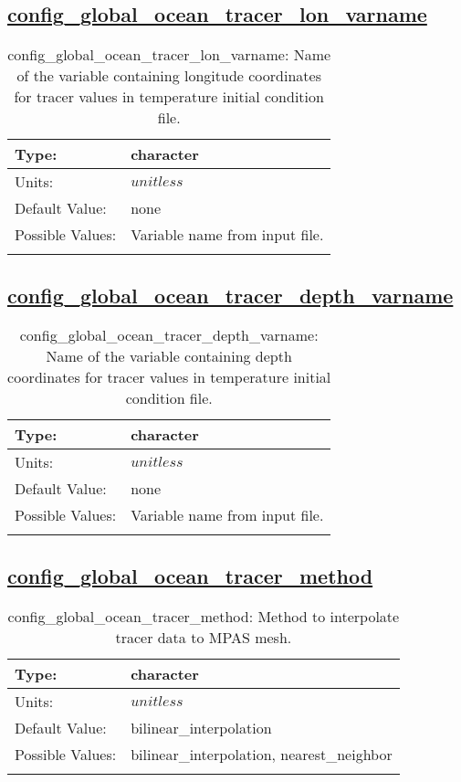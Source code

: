 \subsection[config\_global\_ocean\_tracer\_lon\_varname]{\hyperref[sec:nm_tab_global_ocean]{config\_global\_ocean\_tracer\_lon\_varname}}
\label{subsec:nm_sec_config_global_ocean_tracer_lon_varname}
\begin{center}
\begin{longtable}{| p{2.0in} || p{4.0in} |}
    \hline
    Type: & character \\
    \hline
    Units: & $unitless$ \\
    \hline
    Default Value: & none \\
    \hline
    Possible Values: & Variable name from input file. \\
    \hline
    \caption{config\_global\_ocean\_tracer\_lon\_varname: Name of the variable containing longitude coordinates for tracer values in temperature initial condition file.}
\end{longtable}
\end{center}
\subsection[config\_global\_ocean\_tracer\_depth\_varname]{\hyperref[sec:nm_tab_global_ocean]{config\_global\_ocean\_tracer\_depth\_varname}}
\label{subsec:nm_sec_config_global_ocean_tracer_depth_varname}
\begin{center}
\begin{longtable}{| p{2.0in} || p{4.0in} |}
    \hline
    Type: & character \\
    \hline
    Units: & $unitless$ \\
    \hline
    Default Value: & none \\
    \hline
    Possible Values: & Variable name from input file. \\
    \hline
    \caption{config\_global\_ocean\_tracer\_depth\_varname: Name of the variable containing depth coordinates for tracer values in temperature initial condition file.}
\end{longtable}
\end{center}
\subsection[config\_global\_ocean\_tracer\_method]{\hyperref[sec:nm_tab_global_ocean]{config\_global\_ocean\_tracer\_method}}
\label{subsec:nm_sec_config_global_ocean_tracer_method}
\begin{center}
\begin{longtable}{| p{2.0in} || p{4.0in} |}
    \hline
    Type: & character \\
    \hline
    Units: & $unitless$ \\
    \hline
    Default Value: & bilinear\_interpolation \\
    \hline
    Possible Values: & bilinear\_interpolation, nearest\_neighbor \\
    \hline
    \caption{config\_global\_ocean\_tracer\_method: Method to interpolate tracer data to MPAS mesh.}
\end{longtable}
\end{center}
